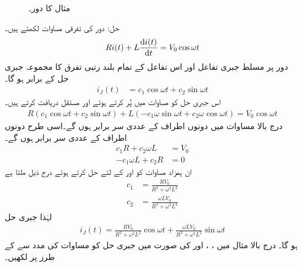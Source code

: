 \begin{figure}
\centering
{}
\caption{مثال  کا دور۔}
\label{شکل_بدلتا_مزاحمت_امالہ_جبری_حل_الف}
\end{figure}

حل: دور کی تفرقی مساوات لکھتے ہیں۔
\begin{align}\label{مساوات_بدلتا_مزاحمت_امالہ_جبری_حل_الف}
R i(t)+L \frac{\dif i(t)}{\dif t}=V_0 \cos \omega t
\end{align}
دور پر مسلط جبری تفاعل اور اس تفاعل کے تمام بلند رتبی تفرق کا مجموعہ جبری حل کے برابر ہو گا۔
\begin{align*}
i_J(t)&=c_1 \cos \omega t+c_2\sin \omega t
\end{align*} 
اس جبری حل کو مساوات  میں پُر کرتے ہوئے  اور  مستقل دریافت کرتے ہیں۔ 
\begin{align*}
R(c_1 \cos \omega t+c_2\sin \omega t)+L (-c_1 \omega \sin\omega t+c_2 \omega \cos \omega t)=V_0 \cos \omega t
\end{align*}
درج بالا مساوات میں دونوں اطراف  کے  عددی سر برابر ہوں گے۔اسی طرح دونوں اطراف  کے عددی سر برابر ہوں گے۔
\begin{align*}
c_1 R+c_2 \omega L&=V_0\\
-c_1 \omega L+c_2 R&=0
\end{align*}
ان ہمزاد مساوات کو  اور  کے لئے حل کرتے ہوئے درج ذیل ملتا ہے
\begin{align*}
c_1&=\frac{R V_0}{R^2+\omega^2 L^2}\\
c_2&=\frac{\omega L V_0}{R^2+\omega^2 L^2}
\end{align*}
لہٰذا جبری حل
\begin{align}\label{مساوات_بدلتا_جبری_حل_الف}
i_J(t)=\frac{R V_0}{R^2+\omega^2 L^2} \cos \omega t+\frac{\omega L V_0}{R^2+\omega^2 L^2} \sin \omega t
\end{align}
ہو گا۔
درج بالا مثال میں ، ،  اور  کی صورت میں جبری حل کو مساوات  کی مدد سے  کے طرز پر لکھیں۔

